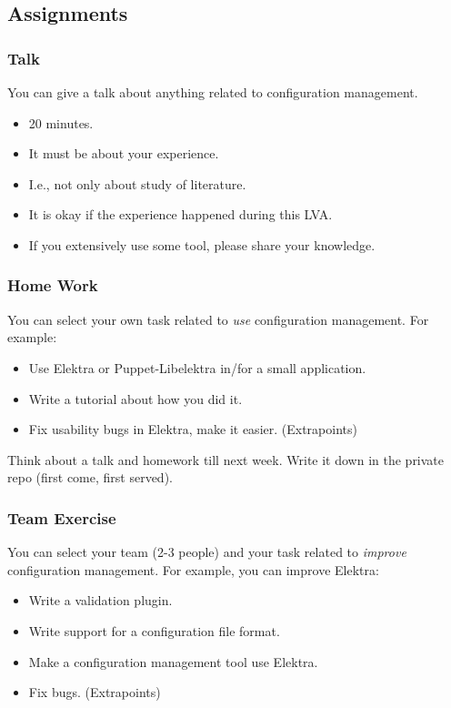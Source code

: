 \documentclass{beamer}
\begin{document}
\subsection{Assignments}
\begin{frame}
	\frametitle{Talk}
	You can give a talk about anything related to configuration management.
	\begin{itemize}
		\item 20 minutes.
		\item It must be about your experience.
		\item I.e., not only about study of literature.
		\item It is okay if the experience happened during this LVA.
		\item If you extensively use some tool, please share your knowledge.
	\end{itemize}
\end{frame}

\begin{frame}
	\frametitle{Home Work}
	You can select your own task related to \emph{use} configuration management.
	For example:
	\begin{itemize}
		\item Use Elektra or Puppet-Libelektra in/for a small application.
		\item Write a tutorial about how you did it.
		\item Fix usability bugs in Elektra, make it easier. (Extrapoints)
	\end{itemize}
\end{frame}

\begin{assignment}
	\begin{task}
	Think about a talk and homework till next week.
	Write it down in the private repo (first come, first served).
	\end{task}
\end{assignment}

\begin{frame}
	\frametitle{Team Exercise}
	You can select your team (2-3 people) and your task related to \emph{improve} configuration management.
	For example, you can improve Elektra:
	\begin{itemize}
		\item Write a validation plugin.
		\item Write support for a configuration file format.
		\item Make a configuration management tool use Elektra.
		\item Fix bugs. (Extrapoints)
	\end{itemize}
\end{frame}
\end{document}
